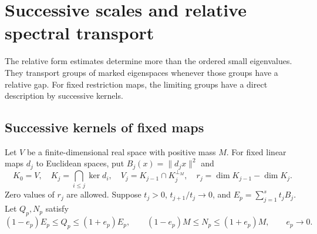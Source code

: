 \section{Successive scales and relative spectral transport}
\label{sec:hierarchies}

The relative form estimates determine more than the
ordered small eigenvalues. They transport groups of
marked eigenspaces whenever those groups have a
relative gap. For fixed restriction maps, the
limiting groups have a direct description by
successive kernels.

\subsection{Successive kernels of fixed maps}

Let $V$ be a finite-dimensional real space with
positive mass $M$. For fixed linear maps $d_j$
to Euclidean spaces, put $B_j(x)=\|d_jx\|^2$
and
\[
 K_0=V,\quad K_j=\bigcap_{i\le j}\ker d_i,\quad
 V_j=K_{j-1}\cap K_j^{\perp_M},\quad
 r_j=\dim K_{j-1}-\dim K_j.
\]
Zero values of $r_j$ are allowed. Suppose
$t_j>0$, $t_{j+1}/t_j\to0$, and
$E_p=\sum_{j=1}^st_jB_j$. Let $Q_p,N_p$
satisfy
\begin{equation}\label{eq:hierarchy-relative-pair}
 (1-e_p)E_p\le Q_p\le(1+e_p)E_p,\qquad
 (1-e_p)M\le N_p\le(1+e_p)M,\qquad e_p\to0.
\end{equation}

